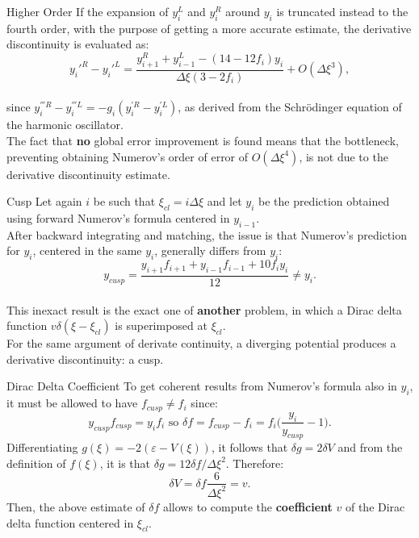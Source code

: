 \documentclass{beamer}
\begin{document}
\begin{frame}{Higher Order}
If the expansion of $y_i^{L}$ and $y_i^{R}$ around $y_i$ is truncated instead to the fourth order, with the purpose of getting a more accurate estimate, the derivative discontinuity is evaluated as:
\vspace{0.5em}
$$y_i'^R-y_i'^L=\frac{y_{i+1}^R+y_{i-1}^L-(14-12f_i)y_i}{\Delta \xi(3-2f_i)}+O(\Delta \xi^3),$$
\vspace{0.5em}
\\since $y_{i}^{'''R}-y_{i}^{'''L}=-g_i(y_{i}^{'R}-y_{i}^{'L})$, as derived from the Schr\"{o}dinger equation of the harmonic oscillator.\\
\vspace{0.5em}
The fact that \textbf{no} global error improvement is found means that the bottleneck, preventing obtaining Numerov's order of error of $O(\Delta \xi^4)$, is not due to the derivative discontinuity estimate.
\end{frame}

\begin{frame}{Cusp}
Let again $i$ be such that $\xi_{cl}=i\Delta \xi$ and let $y_i$ be the prediction obtained using forward Numerov's formula centered in $y_{i-1}$.\\
\vspace{0.5em}
After backward integrating and matching, the issue is that Numerov's prediction for $y_i$, centered in the same $y_i$, generally differs from $y_i$:
$$y_{cusp}=\frac{y_{i+1}f_{i+1}+y_{i-1}f_{i-1}+10f_iy_i}{12}\neq y_i.$$
\\ This inexact result is the exact one of \textbf{another} problem, in which a Dirac delta function $v \delta (\xi-\xi_{cl})$ is superimposed at $\xi_{cl}$.\\ \vspace{0.5em} For the same argument of derivate continuity, a diverging potential produces a derivative discontinuity: a cusp.
\end{frame}

\begin{frame}{Dirac Delta Coefficient}
To get coherent results from Numerov's formula also in $y_i$, it must be allowed to have $f_{cusp}\neq f_i$ since:
$$y_{cusp}f_{cusp}=y_if_i\text{ so }\delta f = f_{cusp}-f_i= f_i\bigg(\frac{y_i}{y_{cusp}}-1\bigg).$$
Differentiating $g(\xi)=-2(\varepsilon-V(\xi))$, it follows that $\delta g=2\delta V$ and from the definition of $f(\xi)$, it is that $\delta g = 12\delta f/\Delta \xi^2$. Therefore:
$$\delta V = \delta f \frac{6}{\Delta \xi^2}=v.$$
Then, the above estimate of $\delta f$ allows to compute the \textbf{coefficient} $v$ of the Dirac delta function centered in $\xi_{cl}$.
\end{frame}
\end{document}
